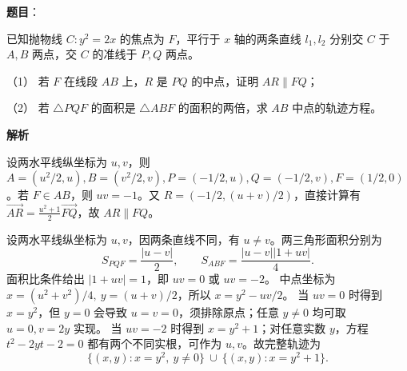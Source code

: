 \begin{answer}

\textbf{题目}：

已知抛物线 \(C:y^2=2x\) 的焦点为 \(F\)，平行于 \(x\) 轴的两条直线 \(l_1,l_2\) 分别交 \(C\) 于 \(A,B\) 两点，交 \(C\) 的准线于 \(P,Q\) 两点。

（1） 若 \(F\) 在线段 \(AB\) 上，\(R\) 是 \(PQ\) 的中点，证明 \(AR\parallel FQ\)；

（2） 若 \(\triangle PQF\) 的面积是 \(\triangle ABF\) 的面积的两倍，求 \(AB\) 中点的轨迹方程。

\textbf{解析}


设两水平线纵坐标为 \(u,v\)，则 \(A=(u^2/2,u), B=(v^2/2,v), P=(-1/2,u), Q=(-1/2,v), F=(1/2,0)\)。若 \(F\in AB\)，则 \(uv=-1\)。又 \(R=(-1/2,(u+v)/2)\)，直接计算有 \(\overrightarrow{AR}=\frac{u^2+1}{2}\overrightarrow{FQ}\)，故 \(AR\parallel FQ\)。


设两水平线纵坐标为 \(u,v\)，因两条直线不同，有 \(u\ne v\)。两三角形面积分别为
\nopagebreak[4]
\[
S_{PQF}=\frac{|u-v|}{2},\qquad
S_{ABF}=\frac{|u-v||1+uv|}{4}.
\]
面积比条件给出 \(|1+uv|=1\)，即 \(uv=0\) 或 \(uv=-2\)。
中点坐标为 \(x=(u^2+v^2)/4,\ y=(u+v)/2\)，所以 \(x=y^2-uv/2\)。
当 \(uv=0\) 时得到 \(x=y^2\)，但 \(y=0\) 会导致 \(u=v=0\)，须排除原点；任意 \(y\ne0\) 均可取 \(u=0,v=2y\) 实现。
当 \(uv=-2\) 时得到 \(x=y^2+1\)；对任意实数 \(y\)，方程 \(t^2-2yt-2=0\) 都有两个不同实根，可作为 \(u,v\)。故完整轨迹为
\nopagebreak[4]
\[
\{(x,y):x=y^2,\ y\ne0\}\ \cup\ \{(x,y):x=y^2+1\}.
\]



\end{answer}
